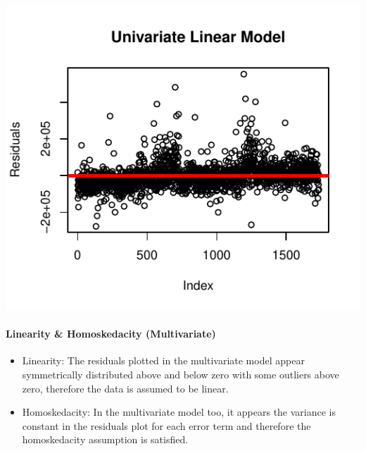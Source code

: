 \documentclass[letterpaper,9pt,twocolumn,twoside,]{pinp}
\begin{document}
\begin{center}\includegraphics{Final-Report_files/figure-latex/unnamed-chunk-9-1} \end{center}

\hypertarget{linearity-homoskedacity-multivariate}{%
\paragraph{Linearity \& Homoskedacity
(Multivariate)}\label{linearity-homoskedacity-multivariate}}

\begin{itemize}
\item
  Linearity: The residuals plotted in the multivariate model appear
  symmetrically distributed above and below zero with some outliers
  above zero, therefore the data is assumed to be linear.
\item
  Homoskedacity: In the multivariate model too, it appears the variance
  is constant in the residuals plot for each error term and therefore
  the homoskedacity assumption is satisfied.
\end{itemize}
\end{document}
